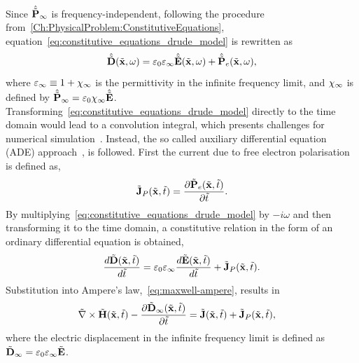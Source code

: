 Since $\hat{\tilde{\mathbf{P}}}_{\infty}$ is frequency-independent, following the procedure
from~\autoref{Ch:PhysicalProblem:ConstitutiveEquations}, equation~\eqref{eq:constitutive_equations_drude_model} is rewritten as
\begin{equation}
  \hat{\tilde{\mathbf{D}}}(\tilde{\mathbf{x}},\omega) = \varepsilon_0 \varepsilon_{\infty} \hat{\tilde{\mathbf{E}}}(\tilde{\mathbf{x}}, \omega) + \hat{\tilde{\mathbf{P}}}_e(\tilde{\mathbf{x}},\omega) ,
\end{equation}
where $\varepsilon_{\infty} \equiv 1 + \chi_{\infty} $ is the permittivity in the
infinite frequency limit, and $\chi_{\infty}$ is defined by $\hat{\tilde{\mathbf{P}}}_{\infty} = \varepsilon_0 \chi_{\infty} \hat{\tilde{\mathbf{E}}} $.
Transforming~\eqref{eq:constitutive_equations_drude_model} directly to the time domain would lead to a convolution integral, which presents challenges for numerical simulation~\cite{kelley1996piecewise}. Instead, the so called auxiliary differential equation (ADE) approach~\cite{Taflove:1989ds,Stannigel:09, Ji:2007dl,okoniewski1997simple,kashiwa1990treatment}, is followed.
First the current due to free electron polarisation is defined as,
\begin{align}
  \tilde{\mathbf{J}}_P(\tilde{\mathbf{x}},\tilde{t}) =  \frac{\partial \tilde{\mathbf{P}}_e(\tilde{\mathbf{x}},\tilde{t})}{\partial \tilde{t} }. \label{eq:polarisation-current-definition}
\end{align}
By multiplying~\eqref{eq:constitutive_equations_drude_model} by $ -i \omega$ and
then transforming it to the time domain, a constitutive relation in
the form of an ordinary differential equation is obtained,
\begin{equation}
  \label{eq:constitutive_equations_drude_model_derivative_TD}
  \frac{d  \tilde{\mathbf{D}} (\tilde{\mathbf{x}},\tilde{t}) }{d \tilde{t}}= \varepsilon_0 \varepsilon_{\infty} \frac{d  \tilde{\mathbf{E}} (\tilde{\mathbf{x}}, \tilde{t}) }{d \tilde{t}} + \tilde{\mathbf{J}}_P(\tilde{\mathbf{x}},\tilde{t}) .
\end{equation}
Substitution into Ampere's law,~\eqref{eq:maxwell-ampere}, results in
\begin{align}
  \tilde{\nabla} \times \tilde{\mathbf{H}}(\tilde{\mathbf{x}},\tilde{t}) - \frac{\partial \tilde{\mathbf{D}}_{\infty}(\tilde{\mathbf{x}}, \tilde{t})}{\partial \tilde{t} } &= \tilde{\mathbf{J}}(\tilde{\mathbf{x}},\tilde{t}) + \tilde{\mathbf{J}}_P(\tilde{\mathbf{x}},\tilde{t}) , \label{eq:drude-ampere}
\end{align}
where the electric displacement in the infinite frequency limit is defined as $\tilde{\mathbf{D}}_{\infty} = \varepsilon_0 \varepsilon_{\infty} \tilde{\mathbf{E}}$.

